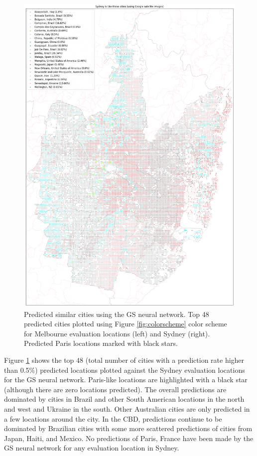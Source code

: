 \documentclass[sageh,times]{sagej}
\begin{document}
\begin{figure}[!htbp]
\includegraphics[scale=0.15]{Images/SydneyOverallAbrev_sat.png} 
\caption{Predicted similar cities using the GS neural network. Top 48 predicted cities plotted using Figure \ref{fig:colorscheme} color scheme for Melbourne evaluation locations (left) and Sydney (right). Predicted Paris locations marked with black stars.} 
 \label{fig:melsat}  
\end{figure} 


Figure \ref{fig:melsat} shows the top 48 (total number of cities with a prediction rate higher than 0.5\%) predicted locations plotted against the Sydney evaluation locations for the GS neural network. Paris-like locations are highlighted with a black star (although there are zero locations predicted). The overall predictions are dominated by cities in Brazil and other South American locations in the north and west and Ukraine in the south. Other Australian cities are only predicted in a few locations around the city. In the CBD, predictions continue to be dominated by Brazilian cities with some more scattered predictions of cities from Japan, Haiti, and Mexico. No predictions of Paris, France have been made by the GS neural network for any evaluation location in Sydney.
\end{document}
